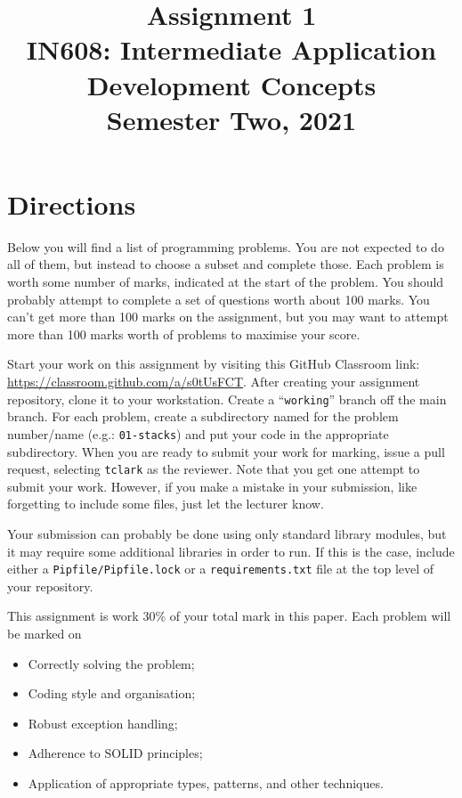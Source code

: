 \documentclass{article}
\begin{document}
\title{Assignment 1\\IN608: Intermediate Application Development Concepts \\Semester Two, 2021}
\date{}
\maketitle

\section*{Directions}
Below you will find a list of programming problems. You are not expected to do all of them, but instead to choose a subset and complete those. Each problem is worth some number of marks, indicated at the start of the problem. You should probably attempt to complete a set of questions worth about 100 marks. You can't get more than 100 marks on the assignment, but you may want to attempt more than 100 marks worth of problems to maximise your score.


Start your work on this assignment by visiting this GitHub Classroom link: \url{https://classroom.github.com/a/s0tUsFCT}. After creating your assignment repository, clone it to your workstation.  Create a ``\texttt{working}'' branch off the main branch. For each problem, create a subdirectory named for the problem number/name (e.g.: \texttt{01-stacks}) and put your code in the appropriate subdirectory. When you are ready to submit your work for marking, issue a pull request, selecting \texttt{tclark} as the reviewer. Note that you get one attempt to submit your work. However, if you make a mistake in your submission, like forgetting to include some files, just let the lecturer know.


Your submission can probably be done using only standard library modules, but it may require some additional libraries in order to run. If this is the case, include either a \texttt{Pipfile/Pipfile.lock} or a \texttt{requirements.txt} file at the top level of your repository. 

This assignment is work 30\% of your total mark in this paper. Each problem will be marked on 
\begin{itemize}
  \item Correctly solving the problem;
  \item Coding style and organisation;
  \item Robust exception handling;
  \item Adherence to SOLID principles;
  \item Application of appropriate types, patterns, and other techniques.
\end{itemize}  
\end{document}
